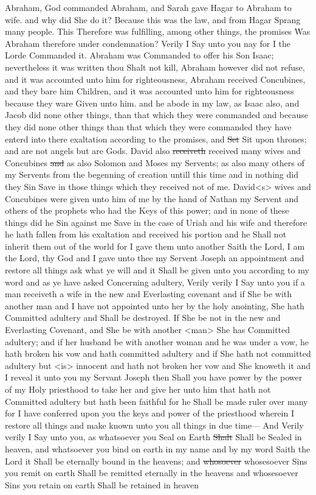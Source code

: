 				Abraham, God commanded Abraham, and Sarah gave Hagar to Abraham to wife. and why did She do it? Because this was the law, and from Hagar Sprang many people. This Therefore was fulfilling, among other things, the promises Was Abraham therefore under condemnation? Verily I Say unto you nay for I the Lorde Commanded it. Abraham was Commanded to offer his Son Isaac; nevertheless it was written thou Shalt not kill, Abraham however did not refuse, and it was accounted unto him for righteousness, Abraham received Concubines, and they bare him Children, and it was accounted unto him for righteousness because they ware Given unto him. and he abode in my law, as Isaac also, and Jacob did none other things, than that which they were commanded and because they did none other things than that which they were commanded they have enterd into there exaltation according to the promises, and \sout{Set} Sit upon thrones; and are not angels but are Gods. David also \sout{receiveth} received many wives and Concubines \sout{and} as also Solomon and Moses my Servents; as also many others of my Servents from the begenning of creation untill this time and in nothing did they Sin Save in those things which they received not of me. David<s> wives and Concubines were given unto him of me by the hand of Nathan my Servent and others of the prophets who had the Keys of this power; and in none of these things did he Sin against me Save in the case of Uriah and his wife and therefore he hath fallen from his exaltation and received his portion and he Shall not inherit them out of the world for I gave them unto another Saith the Lord, I am the Lord, thy God and I gave unto thee my Servent Joseph an appointment and restore all things ask what ye will and it Shall be given unto you according to my word and as ye have asked Concerning adultery, Verily verily I Say unto you if a man receiveth a wife in the new and Everlasting covenant and if She be with another man and I have not appointed unto her by the holy anointing, She hath Committed adultery and Shall be destroyed. If She be not in the new and Everlasting Covenant, and She be with another <man> She has Committed adultery; and if her husband be with another woman and he was under a vow, he hath broken his vow and hath committed adultery and if She hath not committed adultery but <is> innocent and hath not broken her vow and She knoweth it and I reveal it unto you my Servant Joseph then Shall you have power by the power of my Holy priesthood to take her and give her unto him that hath not Committed adultery but hath been faithful for he Shall be made ruler over many for I have conferred upon you the keys and power of the priesthood wherein I restore all things and make known unto you all things in due time--- And Verily verily I Say unto you, as whatsoever you Seal on Earth \sout{Shalt} Shall be Sealed in heaven, and whatsoever you bind on earth in my name and by my word Saith the Lord it Shall be eternally bound in the heavens; and \sout{whosoever} whosesoever Sins you remit on earth Shall be remitted eternally in the heavens and whosesoever Sins you retain on earth Shall be retained in heaven

